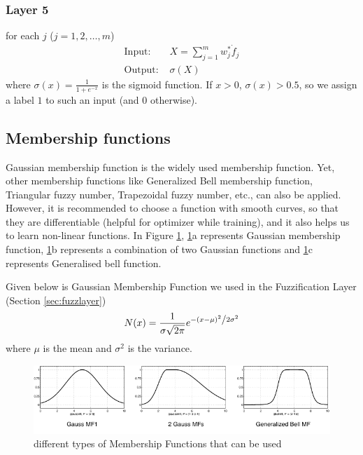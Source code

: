 \documentclass[11pt,a4paper]{article}
\begin{document}
\subsubsection{Layer 5}
for each $j$ ($j = 1,2, \dots ,m$)
\begin{align}
    \text{Input: } & X = \sum_{j=1}^{m} w^*_j\dot f_j \\
    \text{Output: } & \sigma({X})
\end{align}
where $\sigma (x) = \frac{1}{1+e^{-x}}$ is the sigmoid function. If $x>0$, $\sigma(x)>0.5$, so we assign a label $1$ to such an input (and $0$ otherwise).


\subsection{Membership functions}
\label{sec:mf}
Gaussian membership function is the widely used membership function. Yet, other membership functions like Generalized Bell membership function, Triangular fuzzy number, Trapezoidal fuzzy number, etc., can also be applied. However, it is recommended to choose a function with smooth curves, so that they are differentiable (helpful for optimizer while training), and it also helps us to learn non-linear functions. In Figure \ref{fig:gmf1}, \ref{fig:gmf1}a represents Gaussian membership function, \ref{fig:gmf1}b represents a combination of two Gaussian functions and \ref{fig:gmf1}c represents Generalised bell function.

Given below is Gaussian Membership Function we used in the Fuzzification Layer (Section \ref{sec:fuzzlayer})\\

\begin{align}\label{formula:gmf}
    N(x) = \frac{1}{{\sigma \sqrt {2\pi } }}e^{{{ - \left( {x - \mu } \right)^2 } \mathord{\left/ {\vphantom {{ - \left( {x - \mu } \right)^2 } {2\sigma ^2 }}} \right. \kern-\nulldelimiterspace} {2\sigma ^2 }}}
\end{align}
where $\mu$ is the mean and $\sigma ^2$ is the variance.


\begin{figure}[htbp]
\includegraphics[width=2\columnwidth]{gbellandgaussmfs.png}
\caption{\label{fig:gmf1} different types of  Membership Functions that can be used}
\end{figure}
\end{document}
